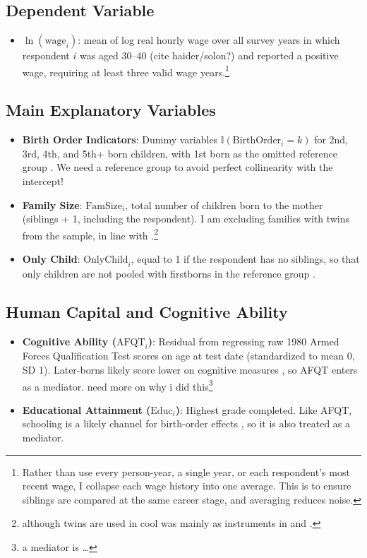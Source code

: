 \documentclass[12pt]{article}
\begin{document}
\subsection*{Dependent Variable}
\begin{itemize}
    \item $\ln(\text{wage}_{i})$: mean of log real hourly wage over all survey years in which respondent $i$ was aged 30--40 (cite haider/solon?) and reported a positive wage, requiring at least three valid wage years.\footnote{Rather than use every person-year, a single year, or each respondent's most recent wage, I collapse each wage history into one average. This is to ensure siblings are compared at the same career stage, and averaging reduces noise.}
\end{itemize}

\subsection*{Main Explanatory Variables}
\begin{itemize}
    \item \textbf{Birth Order Indicators}: Dummy variables $\mathbb{I}(\text{BirthOrder}_i = k)$ for 2nd, 3rd, 4th, and 5th+ born children, with 1st born as the omitted reference group \citep{black}. We need a reference group to avoid perfect collinearity with the intercept!
    \item \textbf{Family Size}: $\text{FamSize}_i$, total number of children born to the mother (siblings + 1, including the respondent). I am excluding families with twins from the sample, in line with \cite{pav}.\footnote{although twins are used in cool was mainly as instruments in \cite{black} and \cite{angrist}.}
    \item \textbf{Only Child}: $\text{OnlyChild}_i$, equal to 1 if the respondent has no siblings, so that only children are not pooled with firstborns in the reference group \citep{booth}.
\end{itemize}

\subsection*{Human Capital and Cognitive Ability}
\begin{itemize}
    \item \textbf{Cognitive Ability ($\text{AFQT}_i$)}: Residual from regressing raw 1980 Armed Forces Qualification Test scores on age at test date (standardized to mean 0, SD 1). Later-borns likely score lower on cognitive measures \citep{pav, black17}, so AFQT enters as a mediator. need more on why i did this\footnote{a mediator is \dots}
    \item \textbf{Educational Attainment ($\text{Educ}_i$)}: Highest grade completed. Like AFQT, schooling is a likely channel for birth-order effects \citep{black, booth}, so it is also treated as a mediator.
\end{itemize}
\end{document}
